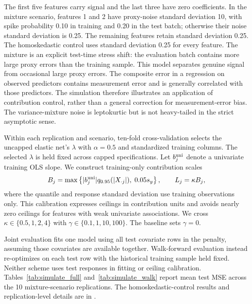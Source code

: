 \documentclass[article,shortnames,nofooter]{jss}
\begin{document}
The first five features carry signal and the last three have zero coefficients. In the mixture scenario, features 1 and 2 have proxy-noise standard deviation 10, with spike probability 0.10 in training and 0.20 in the test batch; otherwise their noise standard deviation is 0.25. The remaining features retain standard deviation 0.25. The homoskedastic control uses standard deviation 0.25 for every feature. The mixture is an explicit test-time stress shift: the evaluation batch contains more large proxy errors than the training sample. This model separates genuine signal from occasional large proxy errors. The composite error in a regression on observed predictors contains measurement error and is generally correlated with those predictors. The simulation therefore illustrates an application of contribution control, rather than a general correction for measurement-error bias. The variance-mixture noise is leptokurtic but is not heavy-tailed in the strict asymptotic sense.

Within each replication and scenario, ten-fold cross-validation selects the uncapped elastic net's $\lambda$ with $\alpha=0.5$ and standardized training columns. The selected $\lambda$ is held fixed across capped specifications. Let $b_j^{\rm uni}$ denote a univariate training OLS slope. We construct training-only contribution scales
\[
B_j=\max\left\{|b_j^{\rm uni}|q_{0.95}(|X_{\cdot j}|),\;0.05s_y\right\},
\qquad L_j=\kappa B_j,
\]
where the quantile and response standard deviation use training observations only. This calibration expresses ceilings in contribution units and avoids nearly zero ceilings for features with weak univariate associations. We cross $\kappa\in\{0.5,1,2,4\}$ with $\gamma\in\{0.1,1,10,100\}$. The baseline sets $\gamma=0$.

Joint evaluation fits one model using all test covariate rows in the penalty, assuming those covariates are available together. Walk-forward evaluation instead re-optimizes on each test row with the historical training sample held fixed. Neither scheme uses test responses in fitting or ceiling calibration. Tables~\ref{tab:simulate_full} and~\ref{tab:simulate_walk} report mean test MSE across the 10 mixture-scenario replications. The homoskedastic-control results and replication-level details are in .

\begin{table}[ht]
    \centering
    \small
    
    \caption{Mean test MSE for joint evaluation in the proxy-noise mixture scenario over 10 replications. The uncapped row is common to all ceiling levels. Bold marks the lowest mean among capped specifications in this table.}
    \label{tab:simulate_full}
\end{table}
\end{document}
